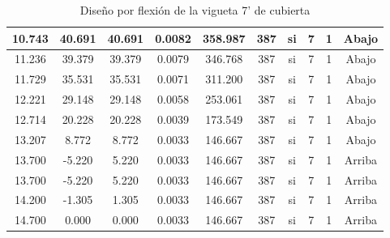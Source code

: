 \begin{table}[H]
{\begin{tabular}{|c|c|c|c|c|c|c|c|c|c|}
    \hline
    10.743 & 40.691 & 40.691 & 0.0082 & 358.987 & 387 & si  & 7   & 1   & Abajo \bigstrut\\
    \hline
    11.236 & 39.379 & 39.379 & 0.0079 & 346.768 & 387 & si  & 7   & 1   & Abajo \bigstrut\\
    \hline
    11.729 & 35.531 & 35.531 & 0.0071 & 311.200 & 387 & si  & 7   & 1   & Abajo \bigstrut\\
    \hline
    12.221 & 29.148 & 29.148 & 0.0058 & 253.061 & 387 & si  & 7   & 1   & Abajo \bigstrut\\
    \hline
    12.714 & 20.228 & 20.228 & 0.0039 & 173.549 & 387 & si  & 7   & 1   & Abajo \bigstrut\\
    \hline
    13.207 & 8.772 & 8.772 & 0.0033 & 146.667 & 387 & si  & 7   & 1   & Abajo \bigstrut\\
    \hline
    13.700 & -5.220 & 5.220 & 0.0033 & 146.667 & 387 & si  & 7   & 1   & Arriba \bigstrut\\
    \hline
    13.700 & -5.220 & 5.220 & 0.0033 & 146.667 & 387 & si  & 7   & 1   & Arriba \bigstrut\\
    \hline
    14.200 & -1.305 & 1.305 & 0.0033 & 146.667 & 387 & si  & 7   & 1   & Arriba \bigstrut\\
    \hline
    14.700 & 0.000 & 0.000 & 0.0033 & 146.667 & 387 & si  & 7   & 1   & Arriba \bigstrut\\
    \hline
 
    \end{tabular}%
    
   
}%
      \caption{Diseño por flexión de la vigueta 7' de cubierta}
  \label{tab:F VT7' CUB}%
\end{table}%